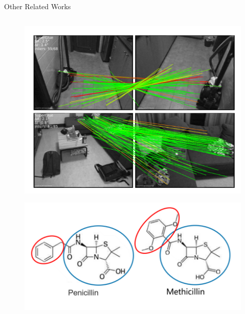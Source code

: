 \documentclass{beamer}
\begin{document}
\begin{frame}{Other Related Works}
\begin{columns}
\begin{column}{0.5\linewidth}
    \begin{figure}
        \centering
        \includegraphics[height=0.4\textheight]{pic/GMN/image_correspondence.png}
    \end{figure}
    \begin{figure}
        \centering
        \includegraphics[height=0.25\textheight]{pic/GMN/molecules.png}
    \end{figure}
\end{column}
\end{columns}
\end{frame}

\end{document}
